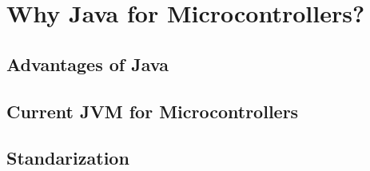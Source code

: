 \chapter{Why Java for Microcontrollers?}\label{C:Why}
\section{Advantages of Java}\label{L:Why:Adv}
\section{Current JVM for Microcontrollers}\label{L:Why:Current}
\section{Standarization}\label{L:Why:Std}